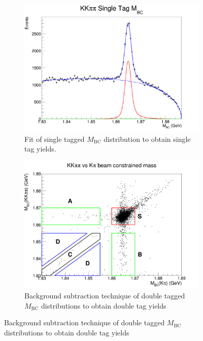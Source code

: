 \documentclass[12pt, a4paper, notitlepage, onecolumn]{article}
\numberwithin{equation}{section}
\begin{document}
\begin{figure}[H] 
  \centering
  \begin{subfigure}{0.5\textwidth}
    \centering
    \includegraphics[width=1\textwidth]{Plots/KKpipiSingleTagMBCPlot.png}
    \caption{Fit of single tagged $M_\text{BC}$ distribution to obtain single tag yields.}
    \label{fig_styield}
  \end{subfigure}%
  \begin{subfigure}{0.5\textwidth}
    \centering
    \includegraphics[width=1\textwidth]{Plots/KpiDoubleTagYield.png}
  \caption{Background subtraction technique of double tagged $M_\text{BC}$ distributions to obtain double tag yields}
    \label{fig_dtyield}
  \end{subfigure}
\end{figure}
\end{document}
